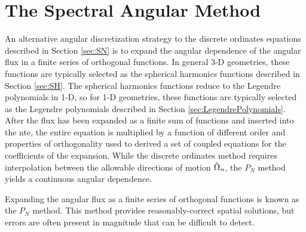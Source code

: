 \section{The Spectral Angular Method}
\label{sec:PN}

An alternative angular discretization strategy to the discrete ordinates equations described in Section \ref{sec:SN} is to expand the angular dependence of the angular flux in a finite series of orthogonal functions. In general 3-D geometries, these functions are typically selected as the spherical harmonics functions described in Section \ref{sec:SH}. The spherical harmonics functions reduce to the Legendre polynomials in 1-D, so for 1-D geometries, these functions are typically selected as the Legendre polynomials described in Section \ref{sec:LegendrePolynomials}. After the flux has been expanded as a finite sum of functions and inserted into the \gls{nte}, the entire equation is multiplied by a function of different order and properties of orthogonality used to derived a set of coupled equations for the coefficients of the expansion. While the discrete ordinates method requires interpolation between the allowable directions of motion \(\hat{\Omega}_n\), the \(P_N\) method yields a continuous angular dependence.

Expanding the angular flux as a finite series of orthogonal functions is known as the \(P_N\) method. This method provides reasonably-correct spatial solutions, but errors are often present in magnitude that can be difficult to detect.

